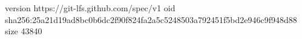 version https://git-lfs.github.com/spec/v1
oid sha256:25a21d19ad8bc0b6dc2f90f824fa2a5c5248503a792451f5bd2e946c9f948d88
size 43840

